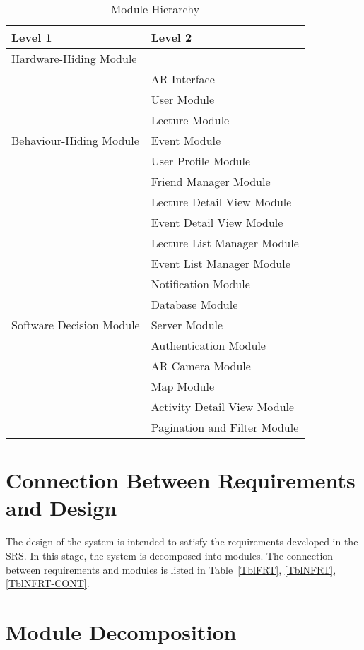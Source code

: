 \documentclass[12pt, titlepage]{article}
\begin{document}
\begin{table}[h!]
\centering
\begin{tabular}{p{} p{}}
\toprule
\textbf{Level 1} & \textbf{Level 2}\\
\midrule

{Hardware-Hiding Module} & ~ \\
\midrule

\multirow{7}{0.3\textwidth}{Behaviour-Hiding Module}
& AR Interface\\
& User Module\\
& Lecture Module\\
& Event Module\\
& User Profile Module\\
& Friend Manager Module\\ 
& Lecture Detail View Module\\
& Event Detail View Module\\
& Lecture List Manager Module\\
& Event List Manager Module\\
& Notification Module\\
\midrule

\multirow{3}{0.3\textwidth}{Software Decision Module}
& Database Module\\
& Server Module\\
& Authentication Module\\
& AR Camera Module\\
& Map Module\\
& Activity Detail View Module\\
& Pagination and Filter Module\\
\bottomrule

\end{tabular}
\caption{Module Hierarchy}
\label{TblMH}
\end{table}

\section{Connection Between Requirements and Design} \label{SecConnection}

The design of the system is intended to satisfy the requirements developed in
the SRS. In this stage, the system is decomposed into modules. The connection
between requirements and modules is listed in Table~\ref{TblFRT}, \ref{TblNFRT}, \ref{TblNFRT-CONT}.

\section{Module Decomposition} \label{SecMD}
\end{document}

